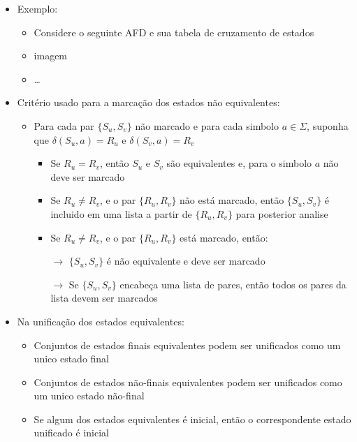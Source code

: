 \documentclass[12pt]{article}
\begin{document}
\begin{itemize}
\begin{itemize}
            \begin{itemize}
                \item Dois estados não trivialmente não-equivalentes se um é 
                final e o outro não
            \end{itemize}
            \item Exemplo:
            \begin{itemize}
                \item Considere o seguinte AFD e sua tabela de cruzamento de estados
                \item[] imagem
                \item[] \dots
            \end{itemize}
            \item Critério usado para a marcação dos estados não equivalentes:
            \begin{itemize}
                \item Para cada par $\{S_u,S_v\}$ não marcado e para cada 
                simbolo $a \in \Sigma$, suponha que $\delta(S_u,a)=R_u$ e 
                $\delta(S_v,a)=R_v$
                \begin{itemize}
                    \item Se $R_u=R_v$, então $S_u$ e $S_v$ são equivalentes e, 
                    para o simbolo $a$ não deve ser marcado
                    \item Se $R_u \neq R_v$, e o par $\{R_u,R_v\}$ não está 
                    marcado, então $\{S_u,S_v\}$ é incluido em uma lista a 
                    partir de $\{R_u,R_v\}$ para posterior analise
                    \item Se $R_u \neq R_v$, e o par $\{R_u,R_v\}$ está 
                    marcado, então:
                    
                    $\rightarrow$ $\{S_u,S_v\}$ é não equivalente e deve ser
                    marcado

                    $\rightarrow$ Se $\{S_u,S_v\}$ encabeça uma lista de pares, 
                    então todos os pares da lista devem ser marcados
                \end{itemize}
            \end{itemize}
            \item Na unificação dos estados equivalentes:
            \begin{itemize}
                \item Conjuntos de estados finais equivalentes podem ser 
                unificados como um unico estado final
                \item Conjuntos de estados não-finais equivalentes podem ser 
                unificados como um unico estado não-final
                \item Se algum dos estados equivalentes é inicial, então o 
                correspondente estado unificado é inicial
            \end{itemize}
        \end{itemize}
    \end{itemize}
\end{document}
